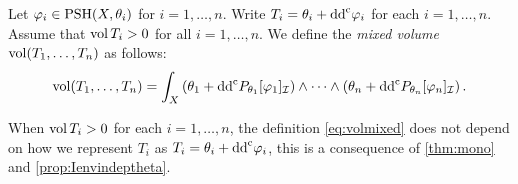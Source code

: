 \begin{definition}\label{def:mix_vol2}
    Let $\varphi_i\in \mathrm{PSH}(X,\theta_i)$ for $i=1,\ldots,n$. Write $T_i=\theta_i+\mathrm{dd}^{\mathrm{c}} \varphi_i$ for each $i=1,\ldots,n$. Assume that $\operatorname{vol} T_i>0$ for all $i=1,\ldots,n$.
    We define the \emph{mixed volume} $\operatorname{vol}(T_1,\ldots,T_n)$ as follows:
            \begin{equation}\label{eq:volmixed}
                \operatorname{vol}(T_1,\ldots,T_n)=\int_X \left(\theta_1+\mathrm{dd}^{\mathrm{c}} P_{\theta_1}[\varphi_1]_{\mathcal{I}}\right)\wedge \dots\wedge \left(\theta_n+\mathrm{dd}^{\mathrm{c}} P_{\theta_n}[\varphi_n]_{\mathcal{I}}\right).
            \end{equation}
\end{definition}
When $\operatorname{vol} T_i>0$ for each $i=1,\ldots,n$, the definition \eqref{eq:volmixed} does not depend on how we represent $T_i$ as $T_i=\theta_i+\mathrm{dd}^{\mathrm{c}} \varphi_i$, this is a consequence of \cref{thm:mono} and \cref{prop:Ienvindeptheta}.


